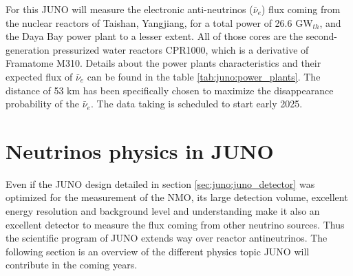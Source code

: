 For this JUNO will measure the electronic anti-neutrinos ($\bar{\nu}_e$) flux coming from the nuclear reactors of Taishan, Yangjiang, for a total power of 26.6 GW$_{th}$, and the Daya Bay power plant to a lesser extent. All of those cores are the second-generation pressurized water reactors CPR1000, which is a derivative of Framatome M310. Details about the power plants characteristics and their expected flux of $\bar{\nu}_e$ can be found in the table \ref{tab:juno:power_plants}.
The distance of 53 km has been specifically chosen to maximize the disappearance probability of the $\bar{\nu}_e$. The data taking is scheduled to start early 2025.

\section{Neutrinos physics in JUNO}

Even if the JUNO design detailed in section \ref{sec:juno:juno_detector} was optimized for the measurement of the NMO, its large detection volume, excellent energy resolution and background level and understanding make it also an excellent detector to measure the flux coming from other neutrino sources. Thus the scientific program of JUNO extends way over reactor antineutrinos. The following section is an overview of the different physics topic JUNO will contribute in the coming years.

